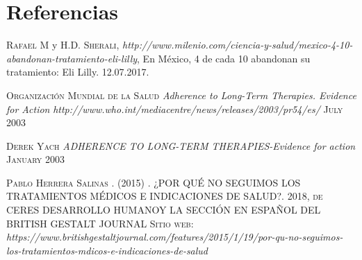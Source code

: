 %	
%
%	
%	
%	
%	
%	

\section{Referencias}

\begin{thebibliography}{X}
	 \textsc{Rafael M} y \textsc{H.D. Sherali},
	\textit{http://www.milenio.com/ciencia-y-salud/mexico-4-10-abandonan-tratamiento-eli-lilly},  En México, 4 de cada 10 abandonan su tratamiento: Eli Lilly. 12.07.2017.
	
	 \textsc{Organización Mundial de la Salud} \textit{Adherence to Long-Term Therapies. Evidence for Action} \textit{http://www.who.int/mediacentre/news/releases/2003/pr54/es/} \textsc{July 2003}
	
	 \textsc{Derek Yach} \textit{ADHERENCE TO LONG-TERM THERAPIES-Evidence for action
} \textsc{January 2003}
	
	 \textsc{Pablo Herrera Salinas . (2015)} \textsc{. ¿POR QUÉ NO SEGUIMOS LOS TRATAMIENTOS MÉDICOS E INDICACIONES DE SALUD?. 2018, de CERES DESARROLLO HUMANOY LA SECCIÓN EN ESPAÑOL DEL BRITISH GESTALT JOURNAL Sitio web:} \textit{https://www.britishgestaltjournal.com/features/2015/1/19/por-qu-no-seguimos-los-tratamientos-mdicos-e-indicaciones-de-salud}
	
	
	
\end{thebibliography}

